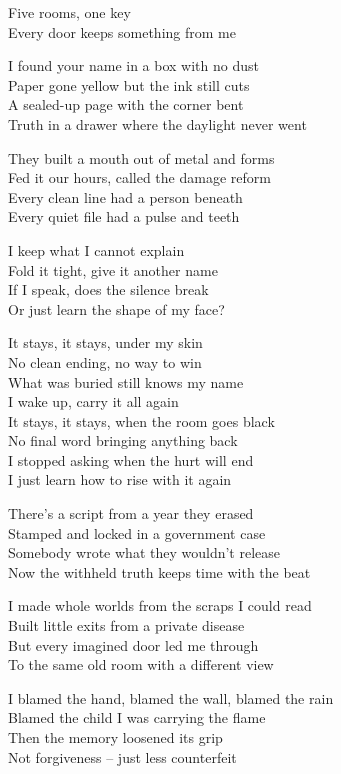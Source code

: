 \begin{lyrics}
Five rooms, one key\\
Every door keeps something from me

I found your name in a box with no dust\\
Paper gone yellow but the ink still cuts\\
A sealed-up page with the corner bent\\
Truth in a drawer where the daylight never went

They built a mouth out of metal and forms\\
Fed it our hours, called the damage reform\\
Every clean line had a person beneath\\
Every quiet file had a pulse and teeth

I keep what I cannot explain\\
Fold it tight, give it another name\\
If I speak, does the silence break\\
Or just learn the shape of my face?

It stays, it stays, under my skin\\
No clean ending, no way to win\\
What was buried still knows my name\\
I wake up, carry it all again\\
It stays, it stays, when the room goes black\\
No final word bringing anything back\\
I stopped asking when the hurt will end\\
I just learn how to rise with it again

There's a script from a year they erased\\
Stamped and locked in a government case\\
Somebody wrote what they wouldn't release\\
Now the withheld truth keeps time with the beat

I made whole worlds from the scraps I could read\\
Built little exits from a private disease\\
But every imagined door led me through\\
To the same old room with a different view

I blamed the hand, blamed the wall, blamed the rain\\
Blamed the child I was carrying the flame\\
Then the memory loosened its grip\\
Not forgiveness -- just less counterfeit


\end{lyrics}

